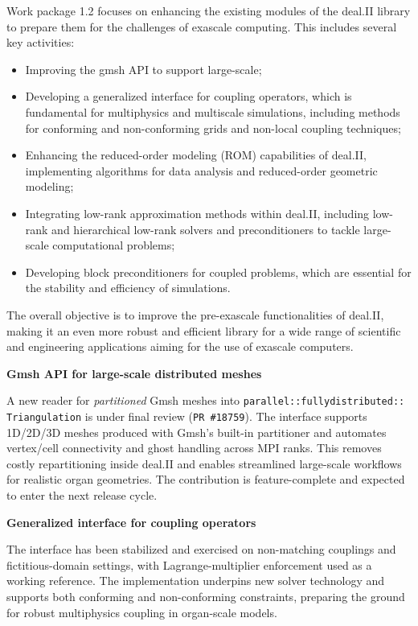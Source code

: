 \documentclass[a4paper,12pt, numbers]{article}
\begin{document}
Work package 1.2 focuses on enhancing the existing modules of the deal.II library to prepare them for the challenges of exascale computing. This includes several key activities: 
\begin{itemize}
\item Improving the gmsh API to support large-scale;
\item Developing a generalized interface for coupling operators, which is fundamental for multiphysics and multiscale simulations, including methods for conforming and non-conforming grids and non-local coupling techniques;
\item Enhancing the reduced-order modeling (ROM) capabilities of deal.II, implementing algorithms for data analysis and reduced-order geometric modeling;
\item Integrating low-rank approximation methods within deal.II, including low-rank and hierarchical low-rank solvers and preconditioners to tackle large-scale computational problems;
\item Developing block preconditioners for coupled problems, which are essential for the stability and efficiency of simulations.
\end{itemize}

The overall objective is to improve the pre-exascale functionalities of deal.II,
making it an even more robust and efficient library for a wide range of
scientific and engineering applications aiming for the use of exascale
computers.

\noindent\textbf{Gmsh API for large-scale distributed meshes}

A new reader for \emph{partitioned} Gmsh meshes into
\texttt{parallel::fullydistributed::\\Triangulation} is under final review
(\texttt{PR \#18759}). The interface supports 1D/2D/3D meshes produced with
Gmsh's built-in partitioner and
automates vertex/cell connectivity and ghost handling across MPI ranks. This
removes costly repartitioning inside deal.II and enables streamlined
large-scale workflows for realistic organ geometries. The contribution is
feature-complete and expected to enter the next release cycle.

\noindent\textbf{Generalized interface for coupling operators} 

The interface has been stabilized and exercised on non-matching couplings and fictitious-domain settings, with Lagrange-multiplier enforcement used as a working reference. The implementation underpins new solver technology and supports both conforming and non-conforming constraints, preparing the ground for robust multiphysics coupling in organ-scale models.
\end{document}
